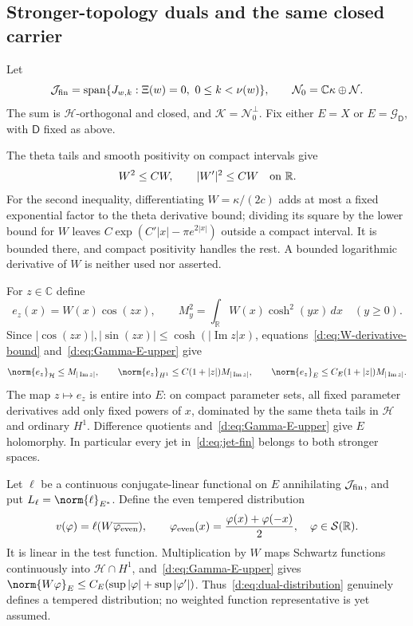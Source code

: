 \documentclass[11pt,a4paper]{article}
\numberwithin{equation}{section}
\theoremstyle{definition}\newtheorem{definition}[theorem]{Definition}
\theoremstyle{remark}\newtheorem{remark}[theorem]{Remark}
\newcommand{\R}{\mathbb R}\newcommand{\C}{\mathbb C}\newcommand{\N}{\mathbb N}
\newcommand{\Hh}{\mathcal H}\newcommand{\Hw}{\mathcal H}
\newcommand{\Nn}{\mathcal N}\newcommand{\Ii}{\mathcal I}\newcommand{\Zz}{\mathcal Z}
\newcommand{\Kk}{\mathcal K}\newcommand{\Aa}{\mathcal A}\newcommand{\Ff}{\mathcal F}
\begin{document}
\subsection{Stronger-topology duals and the same closed carrier}\label{d:sec:Gamma-dual-carrier}

Let
\begin{equation}\label{d:eq:jet-fin}
 \mathcal J_{\rm fin}=\operatorname{span}\{J_{w,k}:\Xi(w)=0,\ 0\le k<\nu(w)\},
 \qquad \Nn_0=\C\kappa\oplus\Nn.
\end{equation}
The sum is $\Hh$-orthogonal and closed, and $\Kk=\Nn_0^\perp$. Fix either $E={X}$ or $E=\mathcal G_{\mathsf D}$, with $\mathsf D$ fixed as above.

The theta tails and smooth positivity on compact intervals give
\begin{equation}\label{d:eq:W-derivative-bound}
 W^2\le C W,\qquad |W'|^2\le C W\quad\hbox{on }\R.
\end{equation}
For the second inequality, differentiating $W=\kappa/(2c)$ adds at most a fixed exponential factor to the theta derivative bound; dividing its square by the lower bound for $W$ leaves
$C\exp(C'|x|-\pi e^{2|x|})$ outside a compact interval. It is bounded there, and compact positivity handles the rest. A bounded logarithmic derivative of $W$ is neither used nor asserted.

For $z\in\C$ define
\[
 e_z(x)=W(x)\cos(zx),\qquad
 M_y^2=\int_\R W(x)\cosh^2(yx)\,dx\quad(y\ge0).
\]
Since $|\cos(zx)|,|\sin(zx)|\le\cosh(|\operatorname{Im}z|x)$, equations~\eqref{d:eq:W-derivative-bound} and~\eqref{d:eq:Gamma-E-upper} give
\begin{equation}\label{d:eq:dual-evaluation}
 \norm{e_z}_{\Hh}\le M_{|\operatorname{Im}z|},\qquad
 \norm{e_z}_{H^1}\le C(1+|z|)M_{|\operatorname{Im}z|},\qquad
 \norm{e_z}_E\le C_E(1+|z|)M_{|\operatorname{Im}z|}.
\end{equation}
The map $z\mapsto e_z$ is entire into $E$: on compact parameter sets, all fixed parameter derivatives add only fixed powers of $x$, dominated by the same theta tails in $\Hh$ and ordinary $H^1$. Difference quotients and~\eqref{d:eq:Gamma-E-upper} give $E$ holomorphy. In particular every jet in~\eqref{d:eq:jet-fin} belongs to both stronger spaces.

Let $\ell$ be a continuous conjugate-linear functional on $E$ annihilating $\mathcal J_{\rm fin}$, and put $L_\ell=\norm{\ell}_{E^*}$. Define the even tempered distribution
\begin{equation}\label{d:eq:dual-distribution}
 v(\varphi)=\ell(W\overline{\varphi_{\rm even}}),\qquad
 \varphi_{\rm even}(x)=\frac{\varphi(x)+\varphi(-x)}2,
 \quad\varphi\in\mathcal S(\R).
\end{equation}
It is linear in the test function. Multiplication by $W$ maps Schwartz functions continuously into $\Hh\cap H^1$, and~\eqref{d:eq:Gamma-E-upper} gives
$\norm{W\varphi}_E\le C_E(\sup|\varphi|+\sup|\varphi'|)$.
Thus~\eqref{d:eq:dual-distribution} genuinely defines a tempered distribution; no weighted function representative is yet assumed.
\end{document}
